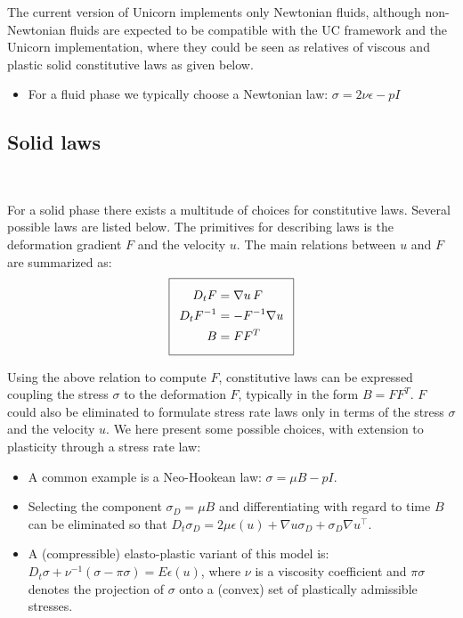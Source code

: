 The current version of Unicorn implements only Newtonian fluids,
although non-Newtonian fluids are expected to be compatible with the
UC framework and the Unicorn implementation, where they could be seen
as relatives of viscous and plastic solid constitutive laws as given
below.

\begin{itemize}
\item
For a fluid phase we typically choose a Newtonian law: $\sigma = 2 \nu \epsilon - pI$
\end{itemize}

\subsection{Solid laws}

\

For a solid phase there exists a multitude of choices for constitutive
laws. Several possible laws are listed below. The primitives for
describing laws is the deformation gradient $F$ and the velocity
$u$. The main relations between $u$ and $F$ are summarized as:
\begin{equation}
  \addtolength{\fboxsep}{5pt}
  \boxed{
    \begin{split}\label{eq:DeformationRate1}
      D_t F &= \nabla u \, F\\
      D_t F^{-1} &= -F^{-1} \nabla u\\
      B &= FF^T
    \end{split}
  }
\end{equation}

Using the above relation to compute $F$, constitutive laws can be
expressed coupling the stress $\sigma$ to the deformation $F$,
typically in the form $B = FF^T$. $F$ could also be eliminated to
formulate stress rate laws only in terms of the stress $\sigma$ and
the velocity $u$. We here present some possible choices, with
extension to plasticity through a stress rate law:

\begin{itemize}
\item
A common example is a Neo-Hookean law: $\sigma = \mu B - pI$.
\item
Selecting the component $\sigma_D = \mu B$ and differentiating with
regard to time $B$ can be eliminated so that $D_t
\sigma_D = 2 \mu \epsilon(u) + \nabla u \sigma_D  + \sigma_D \nabla u^{\top}$.
\item
A (compressible) elasto-plastic variant of this model
is: $D_t \sigma + \nu^{-1} (\sigma - \pi \sigma) = E \epsilon(u)$,
where $\nu$ is a viscosity coefficient and $\pi \sigma$ denotes the
projection of $\sigma$ onto a (convex) set of plastically admissible
stresses.
\end{itemize}


